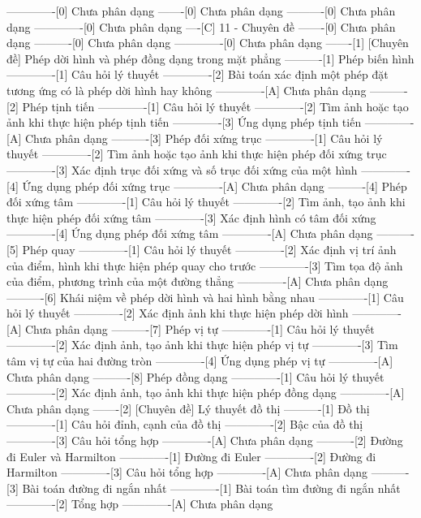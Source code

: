 -------------[0] Chưa phân dạng
-------[0] Chưa phân dạng
----------[0] Chưa phân dạng
-------------[0] Chưa phân dạng
----[C] 11 - Chuyên đề
-------[0] Chưa phân dạng
----------[0] Chưa phân dạng
-------------[0] Chưa phân dạng
-------[1] [Chuyên đề] Phép dời hình và phép đồng dạng trong mặt phẳng
----------[1] Phép biến hình
-------------[1] Câu hỏi lý thuyết
-------------[2] Bài toán xác định một phép đặt tương ứng có là phép dời hình hay không
-------------[A] Chưa phân dạng
----------[2] Phép tịnh tiến
-------------[1] Câu hỏi lý thuyết
-------------[2] Tìm ảnh hoặc tạo ảnh khi thực hiện phép tịnh tiến
-------------[3] Ứng dụng phép tịnh tiến
-------------[A] Chưa phân dạng
----------[3] Phép đối xứng trục
-------------[1] Câu hỏi lý thuyết
-------------[2] Tìm ảnh hoặc tạo ảnh khi thực hiện phép đối xứng trục
-------------[3] Xác định trục đối xứng và số trục đối xứng của một hình
-------------[4] Ứng dụng phép đối xứng trục
-------------[A] Chưa phân dạng
----------[4] Phép đối xứng tâm
-------------[1] Câu hỏi lý thuyết
-------------[2] Tìm ảnh, tạo ảnh khi thực hiện phép đối xứng tâm
-------------[3] Xác định hình có tâm đối xứng
-------------[4] Ứng dụng phép đối xứng tâm
-------------[A] Chưa phân dạng
----------[5] Phép quay
-------------[1] Câu hỏi lý thuyết
-------------[2] Xác định vị trí ảnh của điểm, hình khi thực hiện phép quay cho trước
-------------[3] Tìm tọa độ ảnh của điểm, phương trình của một đường thẳng
-------------[A] Chưa phân dạng
----------[6] Khái niệm về phép dời hình và hai hình bằng nhau
-------------[1] Câu hỏi lý thuyết
-------------[2] Xác định ảnh khi thực hiện phép dời hình
-------------[A] Chưa phân dạng
----------[7] Phép vị tự
-------------[1] Câu hỏi lý thuyết
-------------[2] Xác định ảnh, tạo ảnh khi thực hiện phép vị tự
-------------[3] Tìm tâm vị tự của hai đường tròn
-------------[4] Ứng dụng phép vị tự
-------------[A] Chưa phân dạng
----------[8] Phép đồng dạng
-------------[1] Câu hỏi lý thuyết
-------------[2] Xác định ảnh, tạo ảnh khi thực hiện phép đồng dạng
-------------[A] Chưa phân dạng
-------[2] [Chuyên đề] Lý thuyết đồ thị
----------[1] Đồ thị
-------------[1] Câu hỏi đỉnh, cạnh của đồ thị
-------------[2] Bậc của đồ thị
-------------[3] Câu hỏi tổng hợp
-------------[A] Chưa phân dạng
----------[2] Đường đi Euler và Harmilton
-------------[1] Đường đi Euler
-------------[2] Đường đi Harmilton
-------------[3] Câu hỏi tổng hợp
-------------[A] Chưa phân dạng
----------[3] Bài toán đường đi ngắn nhất
-------------[1] Bài toán tìm đường đi ngắn nhất
-------------[2] Tổng hợp
-------------[A] Chưa phân dạng
